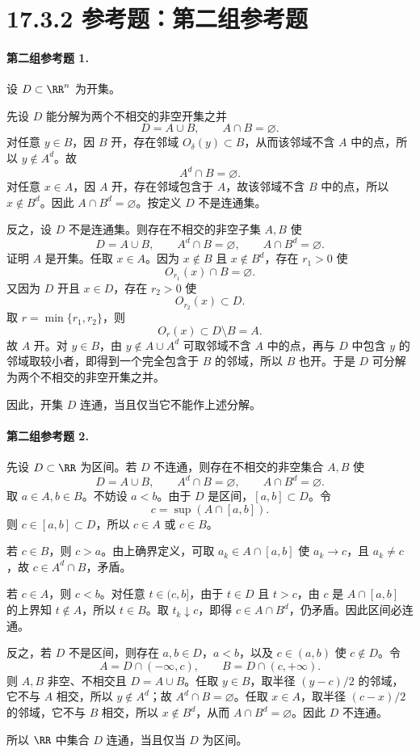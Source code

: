 \section*{17.3.2 参考题：第二组参考题}

\paragraph{第二组参考题 1.}
\begin{xsolution}
设 $D\subset\RR^n$ 为开集。

先设 $D$ 能分解为两个不相交的非空开集之并
\[
  D=A\cup B,
  \qquad A\cap B=\varnothing.
\]
对任意 $y\in B$，因 $B$ 开，存在邻域 $O_\delta(y)\subset B$，从而该邻域不含 $A$ 中的点，所以 $y\notin A^d$。故
\[
  A^d\cap B=\varnothing.
\]
对任意 $x\in A$，因 $A$ 开，存在邻域包含于 $A$，故该邻域不含 $B$ 中的点，所以 $x\notin B^d$。因此 $A\cap B^d=\varnothing$。按定义 $D$ 不是连通集。

反之，设 $D$ 不是连通集。则存在不相交的非空子集 $A,B$ 使
\[
  D=A\cup B,
  \qquad
  A^d\cap B=\varnothing,
  \qquad
  A\cap B^d=\varnothing.
\]
证明 $A$ 是开集。任取 $x\in A$。因为 $x\notin B$ 且 $x\notin B^d$，存在 $r_1>0$ 使
\[
  O_{r_1}(x)\cap B=\varnothing.
\]
又因为 $D$ 开且 $x\in D$，存在 $r_2>0$ 使
\[
  O_{r_2}(x)\subset D.
\]
取 $r=\min\{r_1,r_2\}$，则
\[
  O_r(x)\subset D\setminus B=A.
\]
故 $A$ 开。对 $y\in B$，由 $y\notin A\cup A^d$ 可取邻域不含 $A$ 中的点，再与 $D$ 中包含 $y$ 的邻域取较小者，即得到一个完全包含于 $B$ 的邻域，所以 $B$ 也开。于是 $D$ 可分解为两个不相交的非空开集之并。

因此，开集 $D$ 连通，当且仅当它不能作上述分解。
\end{xsolution}

\paragraph{第二组参考题 2.}
\begin{xsolution}
先设 $D\subset\RR$ 为区间。若 $D$ 不连通，则存在不相交的非空集合 $A,B$ 使
\[
  D=A\cup B,
  \qquad A^d\cap B=\varnothing,
  \qquad A\cap B^d=\varnothing.
\]
取 $a\in A,b\in B$。不妨设 $a<b$。由于 $D$ 是区间，$[a,b]\subset D$。令
\[
  c=\sup(A\cap[a,b]).
\]
则 $c\in[a,b]\subset D$，所以 $c\in A$ 或 $c\in B$。

若 $c\in B$，则 $c>a$。由上确界定义，可取 $a_k\in A\cap[a,b]$ 使 $a_k\to c$，且 $a_k\neq c$，故 $c\in A^d\cap B$，矛盾。

若 $c\in A$，则 $c<b$。对任意 $t\in(c,b]$，由于 $t\in D$ 且 $t>c$，由 $c$ 是 $A\cap[a,b]$ 的上界知 $t\notin A$，所以 $t\in B$。取 $t_k\downarrow c$，即得 $c\in A\cap B^d$，仍矛盾。因此区间必连通。

反之，若 $D$ 不是区间，则存在 $a,b\in D$，$a<b$，以及 $c\in(a,b)$ 使 $c\notin D$。令
\[
  A=D\cap(-\infty,c),
  \qquad
  B=D\cap(c,+\infty).
\]
则 $A,B$ 非空、不相交且 $D=A\cup B$。任取 $y\in B$，取半径 $(y-c)/2$ 的邻域，它不与 $A$ 相交，所以 $y\notin A^d$；故 $A^d\cap B=\varnothing$。任取 $x\in A$，取半径 $(c-x)/2$ 的邻域，它不与 $B$ 相交，所以 $x\notin B^d$，从而 $A\cap B^d=\varnothing$。因此 $D$ 不连通。

所以 $\RR$ 中集合 $D$ 连通，当且仅当 $D$ 为区间。
\end{xsolution}

